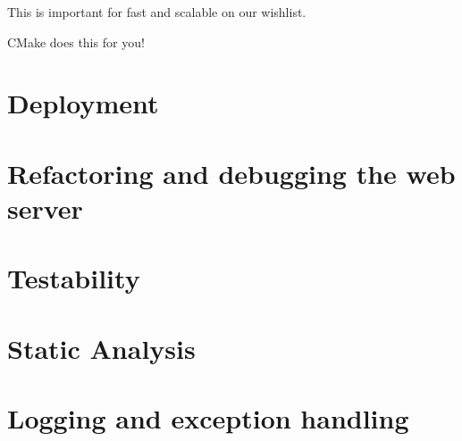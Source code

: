 \documentclass{article}
\begin{document}
This is important for fast and scalable on our wishlist. 

CMake does this for you!



\pagebreak

\section{Deployment}

\pagebreak

\section{Refactoring and debugging the web server}

\pagebreak

\section{Testability}

\pagebreak

\section{Static Analysis}

\pagebreak

\section{Logging and exception handling}

\pagebreak
\end{document}
